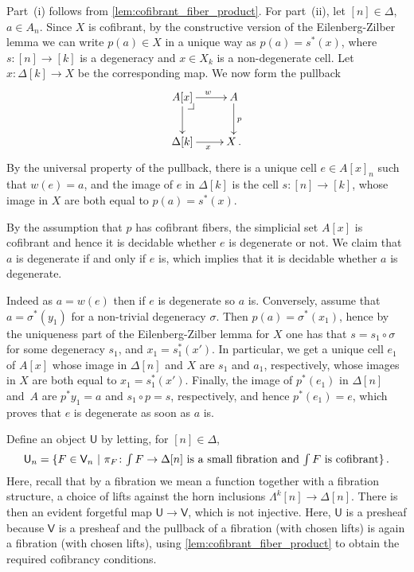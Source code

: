 \documentclass[reqno,10pt,a4paper,oneside,draft]{amsart}
\makeatletter
\renewenvironment{proof}[1][\proofname] {\par\pushQED{\qed}\normalfont\topsep6\p@\@plus6\p@\relax\trivlist\item[\hskip\labelsep\bf#1\@addpunct{.}]\ignorespaces}{\popQED\endtrivlist\@endpefalse}
\numberwithin{equation}{section}
\theoremstyle{mythm}
\theoremstyle{mydef}
\theoremstyle{myrmk}
\newcommand{\pullback}[1]{\save*!/#1-1.2pc/#1:(-1,1)@^{|-}\restore}
\newcommand{\drpullback}{\pullback{dr}}
\newcommand{\ie}{\text{i.e.\ }}
\newcommand{\co}{\colon}
\newcommand{\U}{\mathsf{U}}
\newcommand{\V}{\mathsf{V}}
\makeatother
\begin{document}
\begin{proof} Part~(i) follows from \cref{lem:cofibrant_fiber_product}. For part~(ii), let $[n] \in \Delta$, $a \in A_n$. Since $X$ is cofibrant, by the constructive version of the Eilenberg-Zilber lemma we can write $p(a) \in X$ in a unique way as $p(a) =s^*(x)$, where $s \co [n] \to [k]$ is a degeneracy and 
$x \in X_k$ is a non-degenerate cell. Let $x \co \Delta[k] \rightarrow X$ be the corresponding map. We now form the pullback
\[
\xymatrix{
A[x] \ar[r]^w \ar[d] \drpullback & A  \ar[d]^{p}  \\
\Delta[k] \ar[r]_{x} & X \, . }
\]
By the universal property of the pullback, there is a unique cell $e \in A[x]_n$ such that $w(e)=a$, and the image of $e$ in $\Delta[k]$ is the cell $s \co [n] \to [k]$, whose image in $X$ are both equal to $p(a)=s^*(x)$.

By the assumption that $p$ has cofibrant fibers, the simplicial set $A[x]$ is cofibrant and hence it is decidable whether $e$ is degenerate or not. We claim that $a$ is degenerate if and only if $e$ is, which implies that it is decidable whether $a$ is degenerate.

 Indeed as $a = w(e)$ then if $e$ is degenerate so $a$ is. Conversely, assume that $a=\sigma^*(y_1)$ for a non-trivial degeneracy $\sigma$. Then $p(a)=\sigma^*(x_1)$, hence by the uniqueness part of the Eilenberg-Zilber lemma for $X$ one has that $s=s_1 \circ \sigma$ for some degeneracy $s_1$, and $x_1 = s_1^*(x')$. In particular, we get a unique cell $e_1$ of $A[x]$ whose image in $\Delta[n]$ and $X$ are  $s_1$ and $a_1$, respectively, whose images in $X$ are both equal to $x_1=s_1^*(x')$. Finally, the image of $p^*(e_1)$ in $\Delta[n]$ and~$A$ are  $p^* y_1 =a$ and $s_1 \circ p =s$, respectively, and hence $p^*(e_1) =e$, which proves that $e$ is degenerate as soon as $a$ is.
\end{proof} 


Define an object $\U$ by letting, for $[n] \in \Delta$, 
\[
\U_n = \{ F \in \V_n \ | \ \pi_F \co \textstyle{\int F} \to \Delta[n] \text{ is a small fibration and 
$ \textstyle{\int F}$ is cofibrant} \} \, .
\]
Here, recall that by a fibration we  mean a function together with a fibration structure, \ie a choice of lifts against the horn inclusions $\Lambda^k[n] \to \Delta[n]$.
There is then an evident forgetful map $\U \to \V$, which is not injective. Here, $\U$ is a presheaf because $\V$ is a presheaf and the pullback of a fibration (with chosen lifts) is again a fibration (with chosen lifts), using \cref{lem:cofibrant_fiber_product} to obtain the required cofibrancy conditions.
\end{document}
